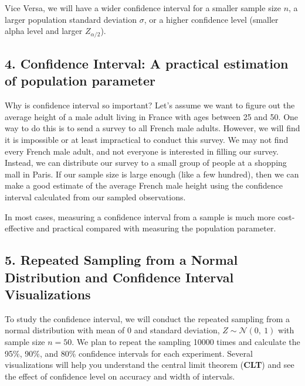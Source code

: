 \documentclass[
]{article}
\begin{document}
Vice Versa, we will have a wider confidence interval for a smaller
sample size \(n\), a larger population standard deviation \(\sigma\), or
a higher confidence level (smaller alpha level and larger
\(Z_{\alpha/2}\)).

\hypertarget{confidence-interval-a-practical-estimation-of-population-parameter}{%
\subsection{4. Confidence Interval: A practical estimation of population
parameter}\label{confidence-interval-a-practical-estimation-of-population-parameter}}

Why is confidence interval so important? Let's assume we want to figure
out the average height of a male adult living in France with ages
between 25 and 50. One way to do this is to send a survey to all French
male adults. However, we will find it is impossible or at least
impractical to conduct this survey. We may not find every French male
adult, and not everyone is interested in filling our survey. Instead, we
can distribute our survey to a small group of people at a shopping mall
in Paris. If our sample size is large enough (like a few hundred), then
we can make a good estimate of the average French male height using the
confidence interval calculated from our sampled observations.

In most cases, measuring a confidence interval from a sample is much
more cost-effective and practical compared with measuring the population
parameter.

\hypertarget{repeated-sampling-from-a-normal-distribution-and-confidence-interval-visualizations}{%
\subsection{5. Repeated Sampling from a Normal Distribution and
Confidence Interval
Visualizations}\label{repeated-sampling-from-a-normal-distribution-and-confidence-interval-visualizations}}

To study the confidence interval, we will conduct the repeated sampling
from a normal distribution with mean of 0 and standard deviation,
\(Z \sim \mathcal{N}\left(0, \ 1\right)\) with sample size \(n=50\). We
plan to repeat the sampling 10000 times and calculate the 95\%, 90\%,
and 80\% confidence intervals for each experiment. Several
visualizations will help you understand the central limit theorem
(\textbf{CLT}) and see the effect of confidence level on accuracy and
width of intervals.
\end{document}
